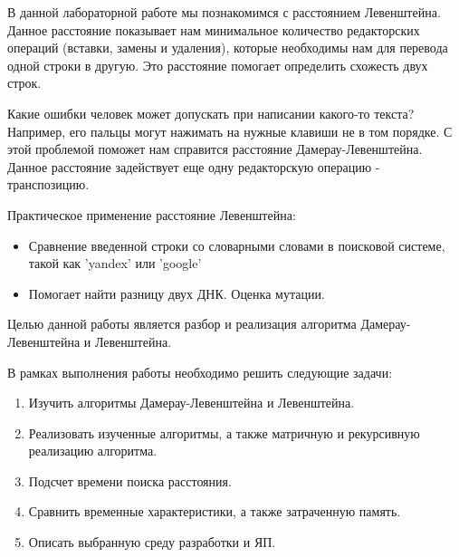 \Introduction

В данной лабораторной работе мы познакомимся с расстоянием Левенштейна. Данное расстояние показывает нам минимальное количество редакторских операций (вставки, замены и удаления), которые необходимы нам для перевода одной строки в другую. Это расстояние помогает определить схожесть двух строк.

Какие ошибки человек может допускать при написании какого-то текста? Например, его пальцы могут нажимать на нужные клавиши не в том порядке. С этой проблемой поможет нам справится расстояние Дамерау-Левенштейна. Данное расстояние задействует еще одну редакторскую операцию - транспозицию.

Практическое применение расстояние Левенштейна:

\begin{itemize}
	\item Сравнение введенной строки со словарными словами в поисковой системе, такой как 'yandex' или 'google'
	\item Помогает найти разницу двух ДНК. Оценка мутации.
\end{itemize}

Целью данной работы является разбор и реализация алгоритма Дамерау-Левенштейна и Левенштейна.

В рамках выполнения работы необходимо решить следующие задачи:

\begin{enumerate}
	\item Изучить алгоритмы Дамерау-Левенштейна и Левенштейна.
	\item Реализовать изученные алгоритмы, а также матричную и рекурсивную реализацию алгоритма.
	\item Подсчет времени поиска расстояния.
	\item Сравнить временные характеристики, а также затраченную память.
	\item Описать выбранную среду разработки и ЯП.
\end{enumerate}